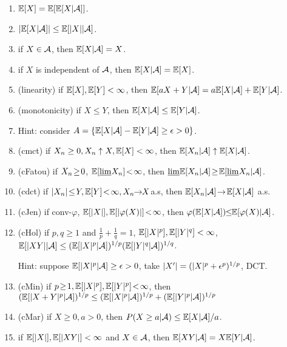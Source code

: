 \begin{prop}
    \begin{enumerate}[leftmargin = 2em, label = (\alph*)]
        \item $\mathbb{E}[X] = \mathbb{E}[\mathbb{E}[X \vert \mathcal{A}]]$.
        \item $\lvert \mathbb{E}[X \vert \mathcal{A}] \rvert \leq \mathbb{E}[\lvert X \rvert \vert \mathcal{A}]$.
        \item if $X \in \mathcal{A}$, then $\mathbb{E}[X \vert \mathcal{A}] = X$.
        \item if $X$ is independent of $\mathcal{A}$, then $\mathbb{E}[X \vert \mathcal{A}] = \mathbb{E}[X]$.
        \item (linearity) if $\mathbb{E}[X], \mathbb{E}[Y] < \infty$, then $\mathbb{E}[a X + Y \vert \mathcal{A}] = a \mathbb{E}[X \vert \mathcal{A}] + \mathbb{E}[Y \vert \mathcal{A}] $.
        \item (monotonicity) if $X \leq Y$, then $\mathbb{E}[X \vert \mathcal{A}] \leq \mathbb{E}[Y \vert \mathcal{A}]$.
        \item [] Hint: consider $A = \{ \mathbb{E}[X \vert \mathcal{A}] - \mathbb{E}[Y \vert \mathcal{A}] \geq \epsilon > 0\}$.
        \item (cmct) if $X_n \geq 0, X_n \uparrow X, \mathbb{E}[X] < \infty$, then $\mathbb{E}[X_n \vert \mathcal{A}] \uparrow \mathbb{E}[X \vert \mathcal{A}]$.
        \item (cFatou) if $X_n \!\geq\! 0$, $\mathbb{E}[\underline{\lim} X_n] \!<\! \infty$, then $\underline{\lim} \mathbb{E}[X_n \vert \mathcal{A}] \!\geq\! \mathbb{E}[\underline{\lim} X_n \vert \mathcal{A}]$.
        \item (cdct) if $\abs{X_n} \tleq Y, \bE{Y} \tl \infty, X_n \!\tra\! X$a.s, then $\mathbb{E}[X_n \vert \mathcal{A}] \!\rightarrow\! \mathbb{E}[X \vert \mathcal{A}]$ a.s.
        \item (cJen) if conv-$\varphi$, $\mathbb{E}[\lvert X \rvert], \mathbb{E}[\lvert \varphi(X) \rvert] \!<\! \infty$, then $\varphi(\mathbb{E}[X \vert \mathcal{A}]) \!\!\leq\!\! \mathbb{E}[\varphi(X) \vert \mathcal{A}]$.
        \item (cHol) if $p, q \geq 1$ and $\frac{1}{p} + \frac{1}{q} = 1$, $\mathbb{E}[\lvert X \rvert^p], \mathbb{E}[\lvert Y \rvert^q] < \infty$, 
            \newline $\mathbb{E}[\lvert X Y \rvert \vert \mathcal{A}] \leq (\mathbb{E}[\lvert X \rvert^p \vert \mathcal{A}])^{1/p} (\mathbb{E}[\lvert Y \rvert^q \vert \mathcal{A}])^{1/q}$.
            
            Hint: suppose $\mathbb{E}[\lvert X \rvert^p \vert \mathcal{A}] \geq \epsilon > 0$, take $\lvert X' \rvert = (\lvert X \rvert^p + \epsilon^p)^{1/p}$, DCT.
        \item (cMin) if $p \!\geq\! 1, \mathbb{E}[\lvert X \rvert^p], \mathbb{E}[\lvert Y \rvert^p] \!<\! \infty$, 
            \newline then $(\mathbb{E}[\lvert X+Y \rvert^p \vert \mathcal{A}])^{1/p} \leq (\mathbb{E}[\lvert X \rvert^p \vert \mathcal{A}])^{1/p} + (\mathbb{E}[\lvert Y \rvert^p \vert \mathcal{A}])^{1/p}$
        \item (cMar) if $X \geq 0, a > 0$, then $P ( X \geq a \vert \mathcal{A} ) \leq \mathbb{E}[X \vert \mathcal{A}] / a$.
        \item if $\mathbb{E}[\lvert X \rvert], \mathbb{E}[\lvert X Y \rvert] < \infty$ and $X \in \mathcal{A}$, then $\mathbb{E}[X Y \vert \mathcal{A}] = X \mathbb{E}[Y \vert \mathcal{A}]$.
        

\end{enumerate}
\end{prop}
